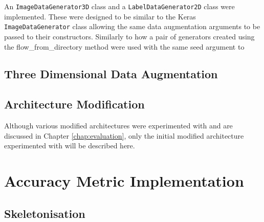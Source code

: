 An \texttt{ImageDataGenerator3D} class and a \texttt{LabelDataGenerator2D} class were implemented. These were designed to be similar to the Keras \texttt{ImageDataGenerator} class allowing the same data augmentation arguments to be passed to their constructors. Similarly to how a pair of generators created using the flow\_from\_directory method were used with the same seed argument to 

\subsection{Three Dimensional Data Augmentation}

\subsection{Architecture Modification}

Although various modified architectures were experimented with and are discussed in Chapter \ref{chap:evaluation}, only the initial modified architecture experimented with will be described here.

\newpage

\section{Accuracy Metric Implementation}

\subsection{Skeletonisation}

